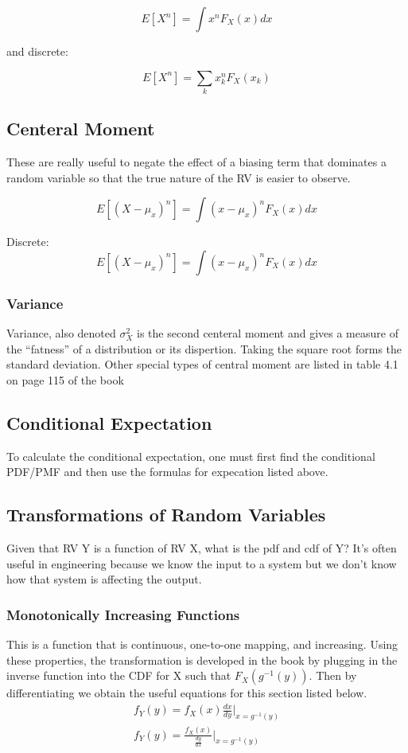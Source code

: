 \documentclass[12pt]{article}
\begin{document}
\[E[X^n] = \int x^nF_X(x) dx\]

and discrete:

\[E[X^n] = \sum_k x_k^nF_X(x_k)\]

\subsection{Centeral Moment}
These are really useful to negate the effect of a biasing term
that dominates a random variable so that the true nature of the
RV is easier to observe.

\[E[(X-\mu_x)^n] = \int (x-\mu_x)^nF_X(x) dx\]

Discrete:
\[E[(X-\mu_x)^n] = \int (x-\mu_x)^nF_X(x) dx\]

\subsubsection{Variance}

Variance, also denoted $\sigma_X^2$ is the second centeral moment
and gives a measure of the ``fatness'' of a distribution or its
dispertion. Taking the square root forms the standard deviation.
Other special types of central moment are listed in table 4.1 on
page 115 of the book

\subsection{Conditional Expectation}
To calculate the conditional expectation, one must first find the
conditional PDF/PMF and then use the formulas for expecation listed
above.

\subsection{Transformations of Random Variables}
Given that RV Y is a function of RV X, what is the pdf and cdf of
Y? It's often useful in engineering because we know the input to a 
system but we don't know how that system is affecting the output.

\subsubsection{Monotonically Increasing Functions}
This is a function that is continuous, one-to-one mapping, and 
increasing. Using these properties, the transformation is developed
in the book by plugging in the inverse function into the CDF
for X such that $F_X(g^{-1}(y))$. Then by differentiating we 
obtain the useful equations for this section listed below.
\begin{align}
  f_Y(y) = f_X(x)\frac{dx}{dy}\big|_{x=g^{-1}(y)} \\
  f_Y(y) = \frac{f_X(x)}{\frac{dy}{dx}}\big|_{x=g^{-1}(y)} \\
\end{align}
\end{document}
